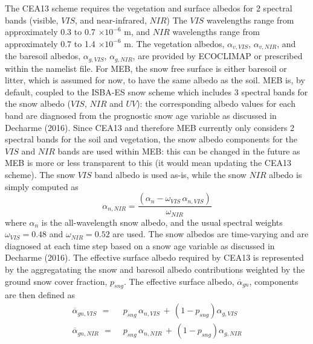 The CEA13 scheme requires the vegetation and surface albedos for 2
spectral bands (visible, $VIS$, and near-infrared, $NIR$)
The $VIS$
wavelengths range from approximately 0.3 to 0.7 $\times 10^{-6}$ m, and $NIR$
wavelengths range from approximately 0.7 to 1.4 $\times 10^{-6}$ m.
%
The vegetation albedos, $\alpha_{v,VIS}$, $\alpha_{v,NIR}$, 
and the baresoil albedos, $\alpha_{g,VIS}$, $\alpha_{g,NIR}$,
are provided by ECOCLIMAP or
prescribed within the namelist file.
%
For MEB,
the snow free surface is either baresoil or litter, which is assumed
for now, to have the same albedo as the soil. 
%
MEB is, by
default, coupled to the ISBA-ES snow scheme which includes 3 spectral
bands for the snow albedo ($VIS$, $NIR$ and $UV$): the corresponding
albedo
values for each band are diagnosed from the prognostic snow age variable
as discussed in
Decharme \etal (2016)\nocite{Decharme16}. Since CEA13 and therefore MEB currently only
considers 2 spectral bands for the soil and vegetation, the snow
albedo components for the $VIS$ and $NIR$ bands are used within MEB: this
can be changed in the future as MEB is more or less transparent to
this (it would mean updating the CEA13 scheme). 
The snow $VIS$ band albedo is used as-is, while the snow $NIR$ albedo is
simply computed as
%
\begin{equation}
%
\alpha_{n,NIR} = \frac{\left(\alpha_n - \omega_{VIS} \, \alpha_{n,VIS} \right)}{\omega_{NIR}}
%
\end{equation}
%
where $\alpha_n$ is the all-wavelength snow albedo, and the usual
spectral weights $\omega_{VIS}=0.48$ and $\omega_{NIR}=0.52$ are used.
The snow albedos are time-varying and are diagnosed at each time step
based on a snow age variable as discussed in Decharme \etal (2016)\nocite{Decharme16}. 
%
The effective surface albedo required by CEA13 is represented
by the aggregatating the snow and baresoil albedo contributions
weighted by the ground snow cover fraction, $p_{sng}$. 
%
The effective surface albedo, ${\overline\alpha}_{gn}$, components are then defined as
%
\begin{align}
\label{eq:albedo_sfc_vis}
{\overline\alpha}_{gn,VIS} \,\ =&\,\, p_{sng} \,\alpha_{n,VIS} \,+\, \left(1-p_{sng}\right)\alpha_{g,VIS}
\\
\label{eq:albedo_sfc_nir}
{\overline\alpha}_{gn,NIR} \,\ =&\,\, p_{sng} \,\alpha_{n,NIR} \,+\, \left(1-p_{sng}\right)\alpha_{g,NIR}
\end{align}
